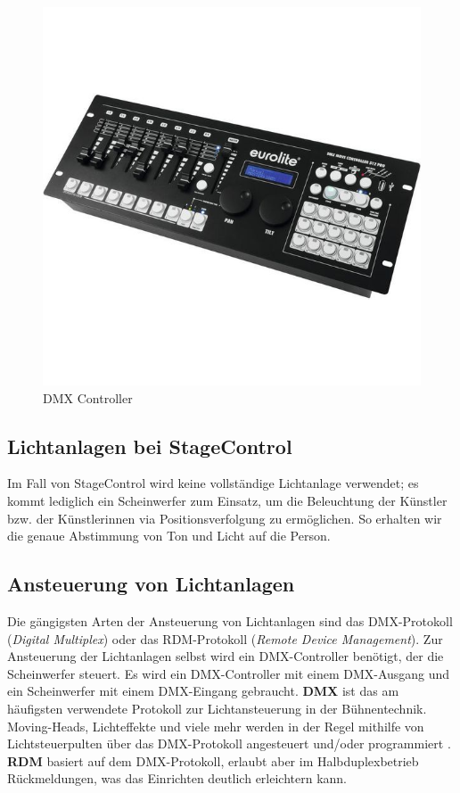 \begin{figure}[H]
	\centering
	\includegraphics[width=0.7\linewidth]{images/DMXController.jpg}
	\caption[DMX Controller]{DMX Controller}
	\label{fig:DMXController}
\end{figure}

\subsection{Lichtanlagen bei StageControl}
Im Fall von StageControl wird keine vollständige Lichtanlage verwendet; es kommt lediglich ein Scheinwerfer zum Einsatz, um die Beleuchtung der Künstler bzw. der Künstlerinnen via Positionsverfolgung zu ermöglichen. So erhalten wir die genaue Abstimmung von Ton und Licht auf die Person.

\subsection{Ansteuerung von Lichtanlagen}

Die gängigsten Arten der Ansteuerung von Lichtanlagen sind das DMX-Protokoll (\textit{Digital Multiplex}) oder das RDM-Protokoll (\textit{Remote Device Management}). Zur Ansteuerung der Lichtanlagen selbst wird ein DMX-Controller benötigt, der die Scheinwerfer steuert. Es wird ein DMX-Controller mit einem DMX-Ausgang und ein Scheinwerfer mit einem DMX-Eingang gebraucht.
\textbf{DMX} ist das am häufigsten verwendete Protokoll zur Lichtansteuerung in der Bühnentechnik. Moving-Heads, Lichteffekte und viele mehr werden in der Regel mithilfe von Lichtsteuerpulten über das DMX-Protokoll angesteuert und/oder programmiert \parencite{LichtanlageRDMDMX}.
\textbf{RDM} basiert auf dem DMX-Protokoll, erlaubt aber im Halbduplexbetrieb Rückmeldungen, was das Einrichten deutlich erleichtern kann.\\


